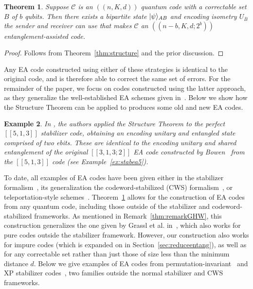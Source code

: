 \documentclass[]{amsart}
\DeclarePairedDelimiter\ket{\lvert}{\rangle}
\newtheorem{theorem}{Theorem}
\newtheorem{example}[theorem]{Example}
\begin{document}
\begin{theorem}\label{thm:eauncondensed}
    Suppose $\mathcal{C}$ is an $\left(\!\left(n,K,d\right)\!\right)$ quantum code with a correctable set $B$ of $b$ qubits.
    Then there exists a bipartite state $\ket{\psi}_{AB}$ and encoding isometry $U_{\overline{B}}$ the sender and receiver can use that makes $\mathcal{C}$ an $\left(\!\left(n-b,K,d;2^b\right)\!\right)$ entanglement-assisted code.
\end{theorem}
\begin{proof}
    Follows from Theorem~\ref{thm:structure} and the prior discussion.
\end{proof}

Any EA code constructed using either of these strategies is identical to the original code, and is therefore able to correct the same set of errors.
For the remainder of the paper, we focus on codes constructed using the latter approach, as they generalize the well-established EA schemes given in~\cite{Bow2002,BDH2006,LB2012}.
Below we show how the Structure Theorem can be applied to produces some old and new EA codes.

\begin{example}
    In \cite[Example 4.7]{CHKNN2025}, the authors applied the Structure Theorem to the perfect $\left[\!\left[5,1,3\right]\!\right]$ stabilizer code, obtaining an encoding unitary and entangled state comprised of two ebits. These are identical to the encoding unitary and shared entanglement of the original $\left[\!\left[3,1,3;2\right]\!\right]$ EA code constructed by Bowen~\cite{Bow2002} from the $\left[\!\left[5,1,3\right]\!\right]$ code (see Example~\ref{ex:stabea5}).
\end{example}

To date, all examples of EA codes have been given either in the stabilizer formalism~\cite{BDH2006}, its generalization the codeword-stabilized (CWS) formalism~\cite{SHB2011,AJH2016}, or teleportation-style schemes~\cite{Gra2021}.
Theorem~\ref{thm:eauncondensed} allows for the construction of EA codes from any quantum code, including those outside of the stabilizer and codeword-stabilized frameworks.
As mentioned in Remark~\ref{thm:remarkGHW}, this construction generalizes the one given by Grassl et al. in~\cite[Theorem 10]{GHW2022}, which also works for pure codes outside the stabilizer framework.
However, our construction also works for impure codes (which is expanded on in Section~\ref{sec:reduceentang}), as well as for any correctable set rather than just those of size less than the minimum distance $d$.
Below we give examples of EA codes from permutation-invariant~\cite{PR2004} and XP stabilizer codes~\cite{NBV2015,WBB2022}, two families outside the normal stabilizer and CWS frameworks.
\end{document}
